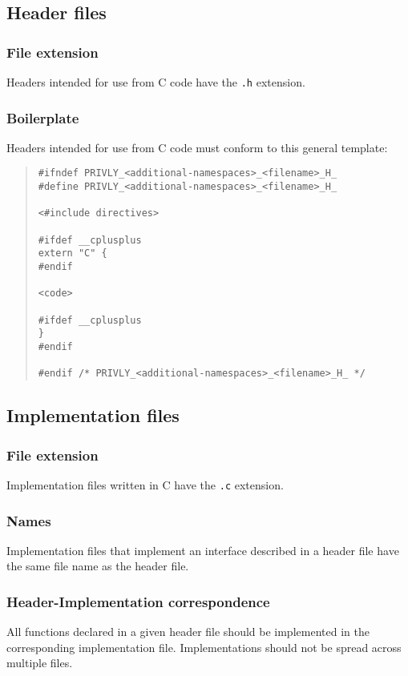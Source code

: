 \documentclass[]{article}
\begin{document}
\subsection{Header files}
\subsubsection{File extension}
Headers intended for use from C code have the \verb'.h' extension. 

\subsubsection{Boilerplate}
Headers intended for use from C code must conform to this general template:

\begin{quote} \begin{verbatim}
#ifndef PRIVLY_<additional-namespaces>_<filename>_H_
#define PRIVLY_<additional-namespaces>_<filename>_H_

<#include directives>

#ifdef __cplusplus
extern "C" {
#endif

<code>

#ifdef __cplusplus
}
#endif

#endif /* PRIVLY_<additional-namespaces>_<filename>_H_ */
\end{verbatim} \end{quote}


\subsection{Implementation files}
\subsubsection{File extension}
Implementation files written in C have the \verb'.c' extension.

\subsubsection{Names}
Implementation files that implement an interface described in a header file have the same file name as the header file.

\subsubsection{Header-Implementation correspondence}
All functions declared in a given header file should be implemented in the corresponding implementation file. Implementations should not be spread across multiple files.
\end{document}
